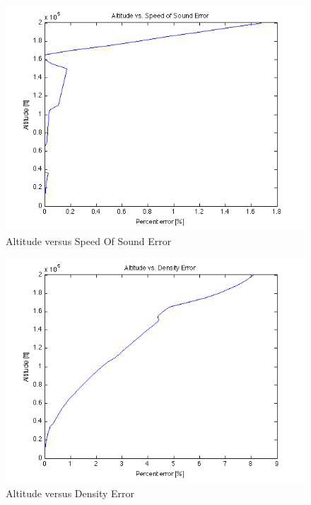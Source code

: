 \documentclass[12pt]{report}
\begin{document}
\begin{figure}[here]
\includegraphics[width=1\textwidth]{AltitudeVsSpeedOfSoundError.png}
\caption{Altitude versus Speed Of Sound Error}
\label{fig:Figure7}
\end{figure}

\begin{figure}[here]
\includegraphics[width=1\textwidth]{AltitudeVsDensityError.png}
\caption{Altitude versus Density Error}
\label{fig:Figure8}
\end{figure}
\end{document}
